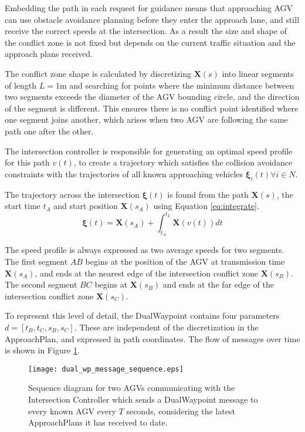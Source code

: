 Embedding the path in each request for guidance means that approaching AGV can use obstacle avoidance planning before they enter the approach lane, and still receive the correct speeds at the intersection. As a result the size and shape of the conflict zone is not fixed but depends on the current traffic situation and the approach plans received.

The conflict zone shape is calculated by discretizing $\bm{X}(s)$ into linear segments of length $L=1$m and searching for points where the minimum distance between two segments exceeds the diameter of the AGV bounding circle, and the direction of the segment is different. This ensures there is no conflict point identified where one segment joins another, which arises when two AGV are following the same path one after the other.  

The intersection controller is responsible for generating an optimal speed profile for this path $v(t)$, to create a trajectory which satisfies the collision avoidance constraints with the trajectories of all known approaching vehicles $\bm{\xi}_i(t) \forall i \in N$. 

The trajectory across the intersection $\bm{\xi}(t)$ is found from the path $\bm{X}(s)$, the start time $t_A$ and start position $\bm{X}(s_A)$ using Equation \ref{eq:integrate}.
\begin{equation}
	\bm{\xi}(t)  = \bm{X}(s_A) + \int_{t_A}^{t_L} \bm{X}\left( v(t) \right)  dt
	\label{eq:integrate}
\end{equation}

The speed profile is always expressed as two average speeds for two segments. The first segment $AB$ begins at the position of the AGV at transmission time $\bm{X}(s_A)$, and ends at the nearest edge of the intersection conflict zone $\bm{X}(s_B)$. The second segment $BC$ begins at $\bm{X}(s_B)$ and ends at the far edge of the intersection conflict zone $\bm{X}(s_C)$.  

To represent this level of detail, the DualWaypoint contains four parameters $d =[t_B, t_C, s_B, s_C]$. These are independent of the discretization in the ApproachPlan, and expressed in path coordinates. The flow of messages over time is shown in Figure \ref{fig:dual_wp_message_sequence}.

\begin{figure}[ht]
	\centering
	\texttt{[image: dual\_wp\_message\_sequence.eps]}
	\caption{Sequence diagram for two AGVs communicating with the Intersection Controller which sends a DualWaypoint message to every known AGV every $T$ seconds, considering the latest ApproachPlans it has received to date. }
	\label{fig:dual_wp_message_sequence}
\end{figure}


